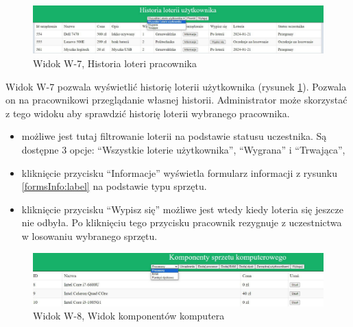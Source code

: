 \begin{figure}[H]
		\centering
    \includegraphics[width=\linewidth]{rys05/view/lotteryHistory.pdf}
    \caption{Widok W-7, Historia loteri pracownika}
    \label{lotteryHistory:label}
\end{figure}


Widok W-7 pozwala wyświetlić historię loterii użytkownika (rysunek \ref{lotteryHistory:label}). Pozwala on na pracownikowi przeglądanie własnej historii. Administrator może skorzystać z tego widoku aby sprawdzić historię loterii wybranego pracownika.
\begin {itemize}
	\item możliwe jest tutaj filtrowanie loterii na podstawie statusu uczestnika. Są dostępne 3 opcje: "`Wszystkie loterie użytkownika"', "`Wygrana"' i "`Trwająca"',
	\item kliknięcie przycisku "`Informacje"' wyświetla formularz informacji z rysunku \ref{formsInfo:label} na podstawie typu sprzętu.
	\item kliknięcie przycisku "`Wypisz się"' możliwe jest wtedy kiedy loteria się jeszcze nie odbyła. Po kliknięciu tego przycisku pracownik rezygnuje z uczestnictwa w losowaniu wybranego sprzętu.
\end{itemize} 


\begin{figure}[H]
		\centering
    \includegraphics[width=\linewidth]{rys05/view/components.pdf}
    \caption{Widok W-8, Widok komponentów komputera}
    \label{components:label}
\end{figure}

